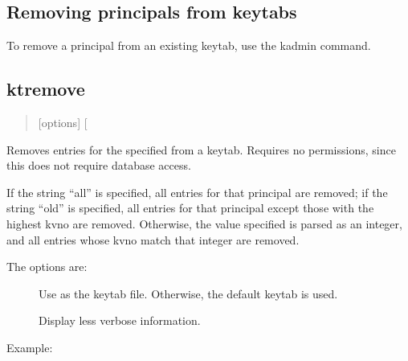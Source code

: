 \documentclass[letterpaper,10pt,english]{sphinxmanual}
\begin{document}
\subsection{Removing principals from keytabs}
\label{\detokenize{admin/appl_servers:removing-principals-from-keytabs}}
To remove a principal from an existing keytab, use the kadmin
 command.


\subsection{ktremove}
\label{\detokenize{admin/appl_servers:ktremove}}\begin{quote}

 {[}options{]}  {[} \textbar{}  \textbar{} \sphinxstyleemphasis{old}{]}
\end{quote}

Removes entries for the specified  from a keytab.  Requires
no permissions, since this does not require database access.

If the string “all” is specified, all entries for that principal are
removed; if the string “old” is specified, all entries for that
principal except those with the highest kvno are removed.  Otherwise,
the value specified is parsed as an integer, and all entries whose
kvno match that integer are removed.

The options are:
\begin{description}
\item[{ }] \leavevmode
Use  as the keytab file.  Otherwise, the default keytab is
used.

\item[{}] \leavevmode
Display less verbose information.

\end{description}

Example:

%
\begin{sphinxVerbatim}[commandchars=\\\{\}]
   
         
\end{sphinxVerbatim}
\end{document}
